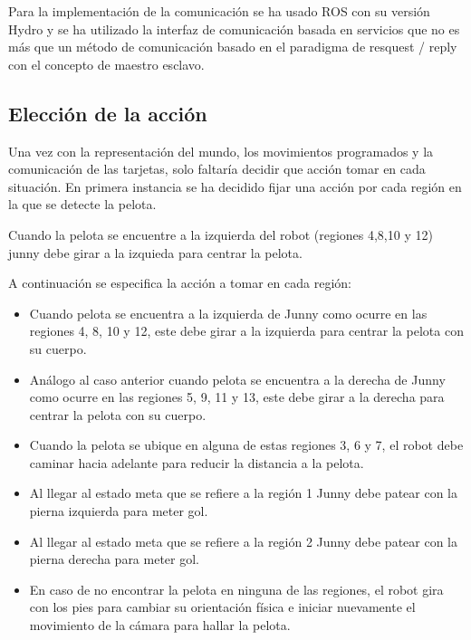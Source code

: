 Para la implementación de la comunicación se ha usado \gls{ROS} con su versión Hydro y se ha utilizado la interfaz de comunicación basada en servicios que no es más que un método de comunicación basado en el paradigma de resquest / reply con el concepto de maestro esclavo.

\subsection{Elecci\'on de la acci\'on}\label{eleccionAccionesFijas}

Una vez con la representaci\'on del mundo, los movimientos programados y la comunicaci\'on de las tarjetas, solo faltaría decidir que acci\'on tomar en cada situación. En primera instancia se ha decidido fijar una acción por cada región en la que se detecte la pelota. 

Cuando la pelota se encuentre a la izquierda del robot (regiones 4,8,10 y 12) junny debe girar a la izquieda para centrar la pelota.

A continuación se especifica la acción a tomar en cada regi\'on: 
 \begin{itemize}
\item Cuando pelota se encuentra a la izquierda de Junny como ocurre en las regiones 4, 8, 10 y 12, este debe girar a la izquierda para centrar la pelota con su cuerpo.

\item An\'alogo al caso anterior cuando pelota se encuentra a la derecha de Junny como ocurre en las regiones  5, 9, 11 y 13, este debe girar a la derecha para centrar la pelota con su cuerpo.

\item Cuando la pelota se ubique en alguna de estas regiones 3, 6 y 7, el robot debe caminar hacia adelante para reducir la distancia a la pelota.

\item Al llegar al estado meta que se refiere a la regi\'on 1 Junny debe patear con la pierna izquierda para meter gol.

\item Al llegar al estado meta que se refiere a la regi\'on 2 Junny debe patear con la pierna derecha para meter gol.

\item En caso de no encontrar la pelota en ninguna de las regiones, el robot gira con los pies para cambiar su orientación física e iniciar nuevamente el movimiento de la cámara para hallar la pelota. 

\end{itemize}

